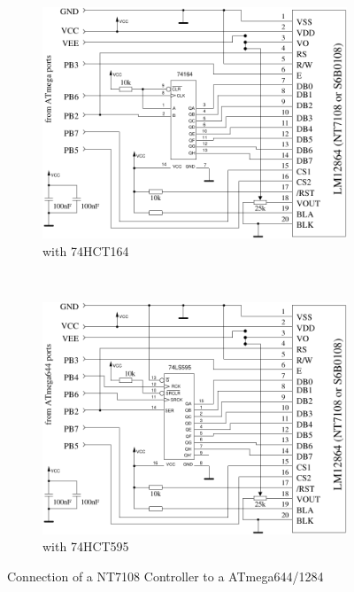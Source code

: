 \begin{figure}[H]
  \begin{subfigure}[b]{.5\textwidth}
    \centering
    \includegraphics[width=.9\textwidth]{../FIG/ST7108serial164_644.pdf}
    \caption{with 74HCT164}
  \end{subfigure}
  ~
  \begin{subfigure}[b]{.5\textwidth}
    \centering
    \includegraphics[width=.9\textwidth]{../FIG/ST7108serial595_644.pdf}
    \caption{with 74HCT595}
  \end{subfigure}
  \caption{Connection of a NT7108 Controller to a ATmega644/1284}
  \label{fig:NT7108lcd_644}
\end{figure}


